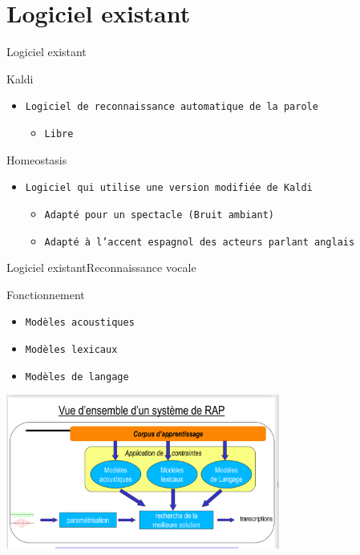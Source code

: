 \documentclass[10pt]{beamer}
\begin{document}
\section{Logiciel existant}
\begin{frame}{Logiciel existant}
	\begin{block}{Kaldi}
		\begin{itemize}		
			\item {\tt Logiciel de reconnaissance automatique de la parole}
			\begin{itemize}
    				\item {\tt Libre}			
			\end{itemize}
		\end{itemize}
	\end{block}
	
	\begin{block}{Homeostasis}
	  	\begin{itemize}
	  		\item {\tt Logiciel qui utilise une version modifiée de Kaldi}
	  		\begin{itemize}
    					\item {\tt Adapté pour un spectacle (Bruit ambiant)}
    					\item {\tt Adapté à l'accent espagnol des acteurs parlant anglais}	
			\end{itemize}
		\end{itemize}
	\end{block}
\end{frame}

\begin{frame}{Logiciel existant}{Reconnaissance vocale}

	\begin{block}{Fonctionnement}
	  	\begin{itemize}
	  		\item {\tt Modèles acoustiques}
	  		\item {\tt Modèles lexicaux}
	  		\item {\tt Modèles de langage}
		\end{itemize}
	\end{block} 
	\begin{center}
	 \includegraphics[width=9cm]{./images/reco_vocale}
	\end{center}
\end{frame}
\end{document}

